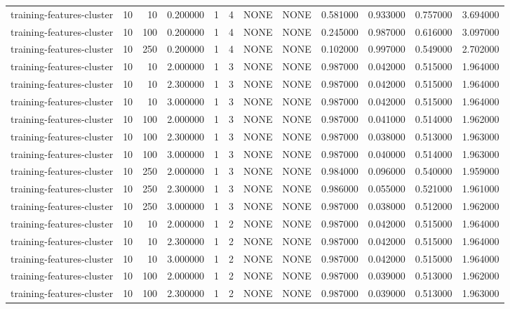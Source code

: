 \begin{tabular}{lrrrllllrrrr}
training-features-cluster & 10 & 10 & 0.200000 & 1 & 4 & NONE & NONE & 0.581000 & 0.933000 & 0.757000 & 3.694000 \\
training-features-cluster & 10 & 100 & 0.200000 & 1 & 4 & NONE & NONE & 0.245000 & 0.987000 & 0.616000 & 3.097000 \\
training-features-cluster & 10 & 250 & 0.200000 & 1 & 4 & NONE & NONE & 0.102000 & 0.997000 & 0.549000 & 2.702000 \\
training-features-cluster & 10 & 10 & 2.000000 & 1 & 3 & NONE & NONE & 0.987000 & 0.042000 & 0.515000 & 1.964000 \\
training-features-cluster & 10 & 10 & 2.300000 & 1 & 3 & NONE & NONE & 0.987000 & 0.042000 & 0.515000 & 1.964000 \\
training-features-cluster & 10 & 10 & 3.000000 & 1 & 3 & NONE & NONE & 0.987000 & 0.042000 & 0.515000 & 1.964000 \\
training-features-cluster & 10 & 100 & 2.000000 & 1 & 3 & NONE & NONE & 0.987000 & 0.041000 & 0.514000 & 1.962000 \\
training-features-cluster & 10 & 100 & 2.300000 & 1 & 3 & NONE & NONE & 0.987000 & 0.038000 & 0.513000 & 1.963000 \\
training-features-cluster & 10 & 100 & 3.000000 & 1 & 3 & NONE & NONE & 0.987000 & 0.040000 & 0.514000 & 1.963000 \\
training-features-cluster & 10 & 250 & 2.000000 & 1 & 3 & NONE & NONE & 0.984000 & 0.096000 & 0.540000 & 1.959000 \\
training-features-cluster & 10 & 250 & 2.300000 & 1 & 3 & NONE & NONE & 0.986000 & 0.055000 & 0.521000 & 1.961000 \\
training-features-cluster & 10 & 250 & 3.000000 & 1 & 3 & NONE & NONE & 0.987000 & 0.038000 & 0.512000 & 1.962000 \\
training-features-cluster & 10 & 10 & 2.000000 & 1 & 2 & NONE & NONE & 0.987000 & 0.042000 & 0.515000 & 1.964000 \\
training-features-cluster & 10 & 10 & 2.300000 & 1 & 2 & NONE & NONE & 0.987000 & 0.042000 & 0.515000 & 1.964000 \\
training-features-cluster & 10 & 10 & 3.000000 & 1 & 2 & NONE & NONE & 0.987000 & 0.042000 & 0.515000 & 1.964000 \\
training-features-cluster & 10 & 100 & 2.000000 & 1 & 2 & NONE & NONE & 0.987000 & 0.039000 & 0.513000 & 1.962000 \\
training-features-cluster & 10 & 100 & 2.300000 & 1 & 2 & NONE & NONE & 0.987000 & 0.039000 & 0.513000 & 1.963000 \\

\end{tabular}
